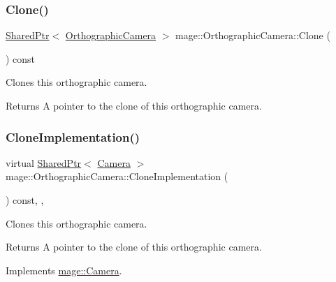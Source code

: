 \subsubsection{\texorpdfstring{Clone()}{Clone()}}
{\footnotesize\ttfamily \hyperlink{namespacemage_a1e01ae66713838a7a67d30e44c67703e}{Shared\+Ptr}$<$ \hyperlink{classmage_1_1_orthographic_camera}{Orthographic\+Camera} $>$ mage\+::\+Orthographic\+Camera\+::\+Clone (\begin{DoxyParamCaption}{ }\end{DoxyParamCaption}) const}

Clones this orthographic camera.

\begin{DoxyReturn}{Returns}
A pointer to the clone of this orthographic camera. 
\end{DoxyReturn}
\hypertarget{classmage_1_1_orthographic_camera_a5a55280980bb4dc24d4b0213ad22cf64}{}\label{classmage_1_1_orthographic_camera_a5a55280980bb4dc24d4b0213ad22cf64} 
\subsubsection{\texorpdfstring{Clone\+Implementation()}{CloneImplementation()}}
{\footnotesize\ttfamily virtual \hyperlink{namespacemage_a1e01ae66713838a7a67d30e44c67703e}{Shared\+Ptr}$<$ \hyperlink{classmage_1_1_camera}{Camera} $>$ mage\+::\+Orthographic\+Camera\+::\+Clone\+Implementation (\begin{DoxyParamCaption}{ }\end{DoxyParamCaption}) const\hspace{0.3cm}{\ttfamily [override]}, {\ttfamily [private]}, {\ttfamily [virtual]}}

Clones this orthographic camera.

\begin{DoxyReturn}{Returns}
A pointer to the clone of this orthographic camera. 
\end{DoxyReturn}


Implements \hyperlink{classmage_1_1_camera_a96c1bee3dc4085c8c7892427518165fc}{mage\+::\+Camera}.

\hypertarget{classmage_1_1_orthographic_camera_a596e2cf22fee8cf30139ffe9d4cdcda7}{}\label{classmage_1_1_orthographic_camera_a596e2cf22fee8cf30139ffe9d4cdcda7} 
